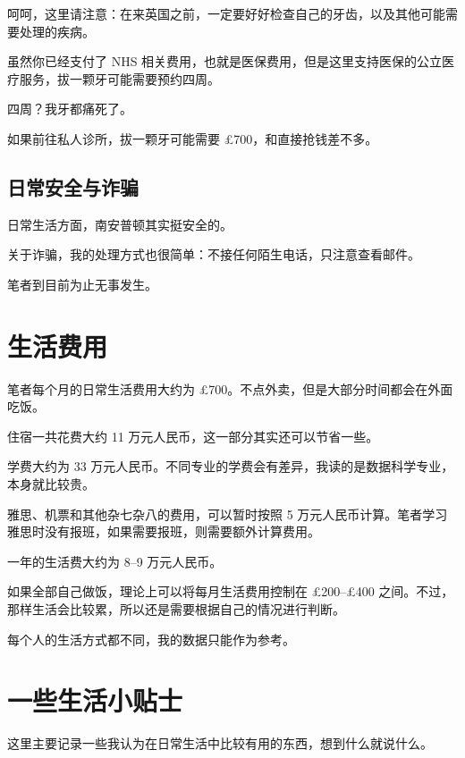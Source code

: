 \documentclass[UTF8,12pt,a4paper]{ctexart}
\begin{document}
呵呵，这里请注意：在来英国之前，一定要好好检查自己的牙齿，以及其他可能需要处理的疾病。

虽然你已经支付了 NHS 相关费用，也就是医保费用，但是这里支持医保的公立医疗服务，拔一颗牙可能需要预约四周。

四周？我牙都痛死了。

如果前往私人诊所，拔一颗牙可能需要 \pounds{}700，和直接抢钱差不多。

\subsection{日常安全与诈骗}

日常生活方面，南安普顿其实挺安全的。

关于诈骗，我的处理方式也很简单：不接任何陌生电话，只注意查看邮件。

笔者到目前为止无事发生。

\section{生活费用}

笔者每个月的日常生活费用大约为 \pounds{}700。不点外卖，但是大部分时间都会在外面吃饭。

住宿一共花费大约 11 万元人民币，这一部分其实还可以节省一些。

学费大约为 33 万元人民币。不同专业的学费会有差异，我读的是数据科学专业，本身就比较贵。

雅思、机票和其他杂七杂八的费用，可以暂时按照 5 万元人民币计算。笔者学习雅思时没有报班，如果需要报班，则需要额外计算费用。

一年的生活费大约为 8--9 万元人民币。

如果全部自己做饭，理论上可以将每月生活费用控制在 \pounds{}200--\pounds{}400 之间。不过，那样生活会比较累，所以还是需要根据自己的情况进行判断。

每个人的生活方式都不同，我的数据只能作为参考。

\section{一些生活小贴士}

这里主要记录一些我认为在日常生活中比较有用的东西，想到什么就说什么。
\end{document}
